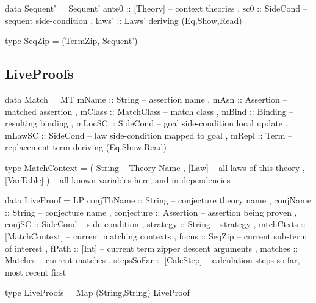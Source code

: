 \begin{code}
data Sequent'
  = Sequent' {
      ante0 :: [Theory] -- context theories
    , sc0       :: SideCond -- sequent side-condition
    , laws'     :: Laws'
    }
  deriving (Eq,Show,Read)
\end{code}


\begin{code}
type SeqZip = (TermZip, Sequent')
\end{code}

\subsection{LiveProofs}

\begin{code}
data Match
 = MT { mName  ::  String     -- assertion name
      , mAsn   ::  Assertion  -- matched assertion
      , mClass ::  MatchClass -- match class
      , mBind  ::  Binding    -- resulting binding
      , mLocSC ::  SideCond   -- goal side-condition local update
      , mLawSC ::  SideCond   -- law side-condition mapped to goal
      , mRepl  ::  Term       -- replacement term
      } deriving (Eq,Show,Read)
\end{code}

\begin{code}
type MatchContext
  = ( String       -- Theory Name
    , [Law]        -- all laws of this theory
    , [VarTable] ) -- all known variables here, and in dependencies
\end{code}

\begin{code}
data LiveProof
  = LP {
      conjThName :: String -- conjecture theory name
    , conjName :: String -- conjecture name
    , conjecture :: Assertion -- assertion being proven
    , conjSC :: SideCond -- side condition
    , strategy :: String -- strategy
    , mtchCtxts :: [MatchContext] -- current matching contexts
    , focus :: SeqZip  -- current sub-term of interest
    , fPath :: [Int] -- current term zipper descent arguments
    , matches :: Matches -- current matches
    , stepsSoFar :: [CalcStep]  -- calculation steps so far, most recent first
    }
\end{code}

\begin{code}
type LiveProofs = Map (String,String) LiveProof
\end{code}
